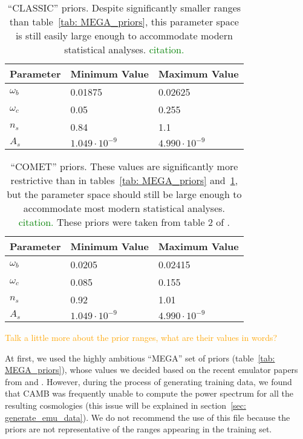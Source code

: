 \begin{table}[ht!]
\centering
\begin{tabular}{l|l|l}
\hline
Parameter & Minimum Value & Maximum Value \\ \hline
$\omega_b$ & 0.01875 & 0.02625 \\
$\omega_c$ & 0.05 & 0.255 \\
$n_s$ & 0.84 & 1.1 \\
$A_s$\footnotemark & $1.049 \cdot 10^{-9}$ & $4.990 \cdot 10^{-9}$  \\
\end{tabular}
	\cprotect\caption[``CLASSIC'' priors]{``CLASSIC'' priors. Despite
 	significantly smaller ranges than table~\ref{tab: MEGA_priors}, this
 	parameter space is still easily large enough to accommodate modern
 	statistical analyses. \textcolor{green}{citation.}}
 \label{tab: CLASSIC_priors}
\end{table}

\begin{table}[ht!]
\centering
\begin{tabular}{l|l|l}
\hline
Parameter & Minimum Value & Maximum Value \\ \hline
$\omega_b$ & 0.0205 & 0.02415 \\
$\omega_c$ & 0.085 & 0.155 \\
$n_s$ & 0.92 & 1.01 \\
$A_s$\footnotemark & $1.049 \cdot 10^{-9}$ & $4.990 \cdot 10^{-9}$  \\
\end{tabular}
	\cprotect\caption[``COMET'' priors]{``COMET'' priors.
	These values are significantly more restrictive than in
	tables~\ref{tab: MEGA_priors} and~\ref{tab: CLASSIC_priors},
	but the parameter space should still be large enough to accommodate
	most modern statistical analyses. \textcolor{green}{citation.}
	These priors were taken from table 2 of \citet{Eggemeier}.}
 \label{tab: COMET_priors}
\end{table}

\textcolor{orange}{Talk a little more about the prior ranges, what are their
values in words?}

At first, we used the highly ambitious ``MEGA'' set of priors
(table~\ref{tab: MEGA_priors}), whose values we decided based on the recent 
emulator papers from \citet{Mancini} and \citet{Arico}.
However, during the process of generating training data, 
we found that CAMB was frequently unable to compute the power spectrum for
all the
resulting cosmologies (this issue will be explained in
section~\ref{sec: generate_emu_data}). We do not recommend the use of this
file because the priors are not representative of the ranges appearing in the
training set.

